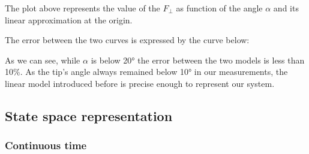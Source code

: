 
                The plot above represents the value of the $F_\perp$ as function of the angle $\alpha$ and its linear approximation at the origin.

                The error between the two curves is expressed by the curve below:

                As we can see, while $\alpha$ is below 20° the error between the two models is less than 10$\%$. As the tip's angle always remained below 10° in our measurements, the linear model introduced before is precise enough to represent our system.

        \subsection{State space representation}
            \subsubsection{Continuous time}

